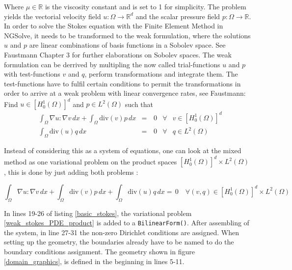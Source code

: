 \null

Where $\mu \in \mathbb{R}$ is the viscosity constant and is set to 1 for simplicity. 
The problem yields the vectorial velocity field $u:\Omega \rightarrow \mathbb{R}^d$ and 
the scalar pressure field $p:\Omega \rightarrow \mathbb{R}$. In order to solve the Stokes equation with the Finite Element Method in NGSolve,
it needs to be transformed to the weak formulation, where the solutions $u$ and $p$ are linear combinations of basis functions in a Sobolev space.
See Faustmann\cite{lecture_notes_faustmann_numPDE} Chapter 3 for further elaborations on Sobolev spaces. The weak formulation can be derrived by
multipling the now called trial-functions $u$ and $p$ with test-functions $v$ and $q$, perform transformations and integrate them. The test-functions have to fulfil certain
conditions to permit the transformations in order to arrive at a weak problem with 
linear convergence rates, see Faustmann\cite{lecture_notes_faustmann_numPDE}: \\

Find $u \in [H^1_0(\Omega)]^d$ and $p \in L^2(\Omega)$ such that
\begin{equation}\label{weak_stokes_PDE}
    \begin{aligned}
    &\int_{\Omega} \nabla u : \nabla v \, dx + \int_{\Omega} \mathrm{div}(v)p \, dx &=& \, 0 &\forall& v \in [H^1_0(\Omega)]^d \\
    &\int_{\Omega} \mathrm{div}(u)q \, dx &=& \, 0   &\forall& q \in L^2(\Omega)
    \end{aligned}
\end{equation}

\null

Instead of considering this as a system of equations, one can look at the mixed method as one variational problem on
the product spaces $[H^1_0(\Omega)]^d \times L^2(\Omega)$, this is done by just adding both problems \cite{lecture_notes_faustmann_numPDE}:

\null

\begin{equation}\label{weak_stokes_PDE_product}
    \int_{\Omega} \nabla u : \nabla v \, dx + \int_{\Omega} \mathrm{div}(v)p \, dx + \int_{\Omega} \mathrm{div}(u)q \, dx = \, 0 \quad \forall (v,q)
    \in  [H^1_0(\Omega)]^d \times L^2(\Omega)
\end{equation}

\null

In lines 19-26 of listing \ref{basic_stokes}, the variational problem \ref{weak_stokes_PDE_product} is added to
a \texttt{BilinearForm()}. After assembling of the system, in line 27-31 the non-zero Dirichlet conditions are assigned. 
When setting up the geometry, the boundaries already have to be named to do the boundary conditions assignment. The geometry
shown in figure \ref{domain_graphics}, is defined in the beginning in lines 5-11.


